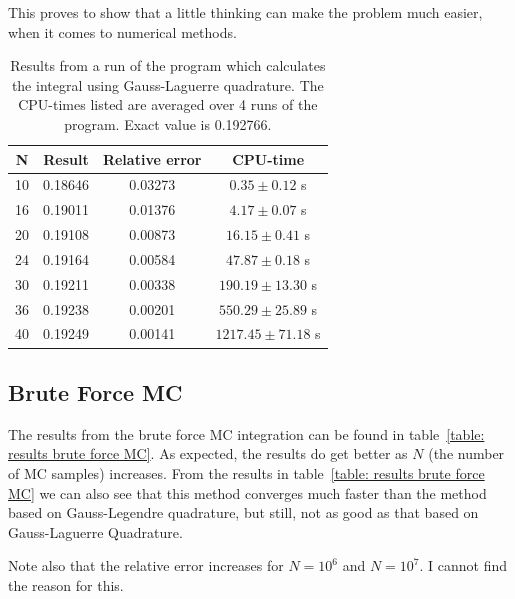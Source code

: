 \documentclass[twoside, 11pt]{article}
\begin{document}
		This proves to show that a little thinking can make the problem much easier, when it comes to numerical methods.
		
		\begin{table}[h]
			\centering
			\caption{Results from a run of the program which calculates the integral using Gauss-Laguerre quadrature. The CPU-times listed are averaged over 4 runs of the program. Exact value is 0.192766.}
			\label{table: results gauss-laguerre}
			\begin{tabular}{|c|c|c|c|}
\hline
\textbf{N} 	&	\textbf{Result}	&	\textbf{Relative error}	&	\textbf{CPU-time} \\ \hline 
10 	&	0.18646	&	0.03273			&	$0.35 \pm 0.12$ s	\\ \hline
16 	&	0.19011	&	0.01376			&	$4.17 \pm 0.07$ s	\\ \hline
20 	&	0.19108	&	0.00873			&	$16.15 \pm 0.41$ s	\\ \hline
24 	&	0.19164	&	0.00584			&	$47.87 \pm 0.18$ s	\\ \hline
30 	&	0.19211	&	0.00338			&	$190.19 \pm 13.30$ s	\\ \hline
36 	&	0.19238	&	0.00201			&	$550.29 \pm 25.89$ s	\\ \hline
40 	&	0.19249	&	0.00141			&	$1217.45 \pm 71.18$ s	\\ \hline	
			\end{tabular}
		\end{table}
	
	\subsection{Brute Force MC}
		The results from the brute force MC integration can be found in table~\ref{table: results brute force MC}. As expected, the results do get better as $N$ (the number of MC samples) increases. From the results in table~\ref{table: results brute force MC} we can also see that this method converges much faster than the method based on Gauss-Legendre quadrature, but still, not as good as that based on Gauss-Laguerre Quadrature. 
		
		Note also that the relative error increases for $N=10^6$ and $N=10^7$. I cannot find the reason for this.
		
\end{document}

